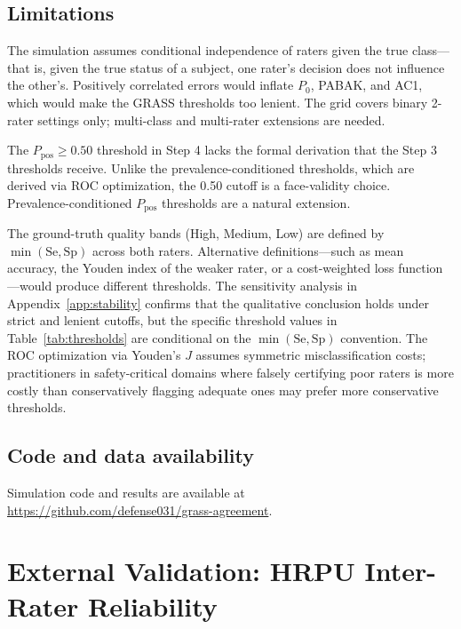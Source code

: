 \documentclass[11pt]{article}
\begin{document}
\subsection*{Limitations}

The simulation assumes conditional independence of raters given the true class---that is, given the true status of a subject, one rater's decision does not influence the other's. Positively correlated errors would inflate $P_0$, PABAK, and AC1, which would make the GRASS thresholds too lenient. The grid covers binary 2-rater settings only; multi-class and multi-rater extensions are needed.

The $P_{\text{pos}} \geq 0.50$ threshold in Step 4 lacks the formal derivation that the Step 3 thresholds receive. Unlike the prevalence-conditioned thresholds, which are derived via ROC optimization, the 0.50 cutoff is a face-validity choice. Prevalence-conditioned $P_{\text{pos}}$ thresholds are a natural extension.

The ground-truth quality bands (High, Medium, Low) are defined by $\min(\text{Se}, \text{Sp})$ across both raters. Alternative definitions---such as mean accuracy, the Youden index of the weaker rater, or a cost-weighted loss function---would produce different thresholds. The sensitivity analysis in Appendix~\ref{app:stability} confirms that the qualitative conclusion holds under strict and lenient cutoffs, but the specific threshold values in Table~\ref{tab:thresholds} are conditional on the $\min(\text{Se}, \text{Sp})$ convention. The ROC optimization via Youden's $J$ assumes symmetric misclassification costs; practitioners in safety-critical domains where falsely certifying poor raters is more costly than conservatively flagging adequate ones may prefer more conservative thresholds.

\subsection*{Code and data availability}

Simulation code and results are available at \url{https://github.com/defense031/grass-agreement}.



\newpage
\appendix

\section{External Validation: HRPU Inter-Rater Reliability}
\label{app:hrpu}
\end{document}
